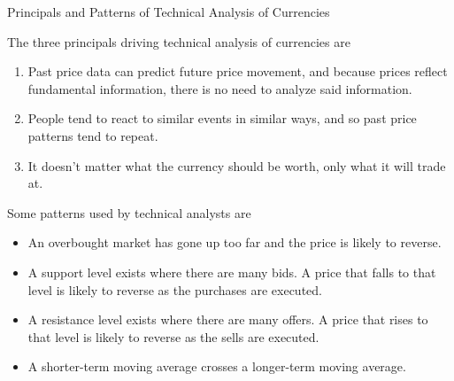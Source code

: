 \documentclass[../custom]{flashcards}
\newcommand{\studyArea}{Risk Management}
\begin{document}
\begin{flashcard}[\studyArea]{Principals and Patterns of Technical Analysis of Currencies}
    \begin{flushleft}
        The three principals driving technical analysis of currencies are
        \begin{enumerate}
            \item Past price data can predict future price movement, and because prices reflect fundamental information, there is no need to analyze said information.
            \item People tend to react to similar events in similar ways, and so past price patterns tend to repeat.
            \item It doesn't matter what the currency should be worth, only what it will trade at.
        \end{enumerate}
        Some patterns used by technical analysts are
        \begin{itemize}
            \item An overbought market has gone up too far and the price is likely to reverse.
            \item A support level exists where there are many bids. A price that falls to that level is likely to reverse as the purchases are executed.
            \item A resistance level exists where there are many offers. A price that rises to that level is likely to reverse as the sells are executed.
            \item A shorter-term moving average crosses a longer-term moving average.
        \end{itemize}
    \end{flushleft}
\end{flashcard}
\end{document}
